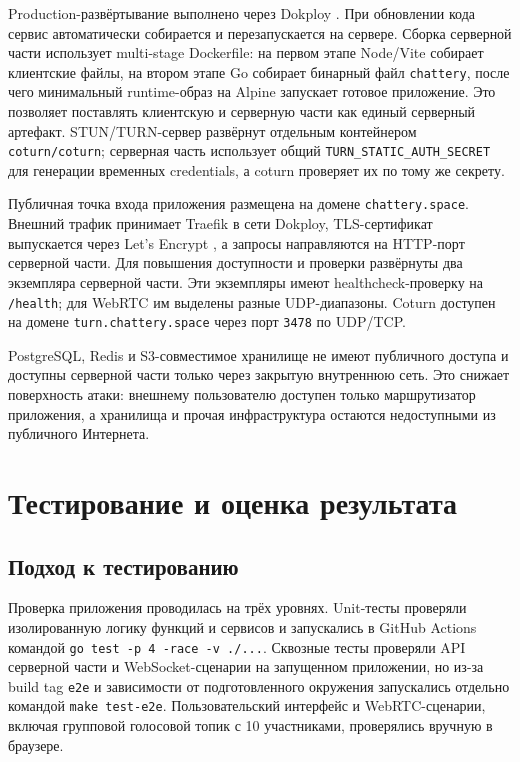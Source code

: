 \documentclass[a4paper,12pt]{extarticle}
\begin{document}
Production-развёртывание выполнено через Dokploy \cite{dokploy}. При обновлении кода сервис автоматически собирается и перезапускается на сервере. Сборка серверной части использует multi-stage Dockerfile: на первом этапе Node/Vite собирает клиентские файлы, на втором этапе Go собирает бинарный файл \texttt{chattery}, после чего минимальный runtime-образ на Alpine запускает готовое приложение. Это позволяет поставлять клиентскую и серверную части как единый серверный артефакт. STUN/TURN-сервер развёрнут отдельным контейнером \texttt{coturn/coturn}; серверная часть использует общий \texttt{TURN\_STATIC\_AUTH\_SECRET} для генерации временных credentials, а coturn проверяет их по тому же секрету.

Публичная точка входа приложения размещена на домене \texttt{chattery.space}. Внешний трафик принимает Traefik в сети Dokploy, TLS-сертификат выпускается через Let's Encrypt \cite{lets_encrypt}, а запросы направляются на HTTP-порт серверной части. Для повышения доступности и проверки развёрнуты два экземпляра серверной части. Эти экземпляры имеют healthcheck-проверку на \texttt{/health}; для WebRTC им выделены разные UDP-диапазоны. Coturn доступен на домене \texttt{turn.chattery.space} через порт \texttt{3478} по UDP/TCP.

PostgreSQL, Redis и S3-совместимое хранилище не имеют публичного доступа и доступны серверной части только через закрытую внутреннюю сеть. Это снижает поверхность атаки: внешнему пользователю доступен только маршрутизатор приложения, а хранилища и прочая инфраструктура остаются недоступными из публичного Интернета.

\section{Тестирование и оценка результата}

\subsection{Подход к тестированию}

Проверка приложения проводилась на трёх уровнях. Unit-тесты проверяли изолированную логику функций и сервисов и запускались в GitHub Actions командой \texttt{go test -p 4 -race -v ./...}. Сквозные тесты проверяли API серверной части и WebSocket-сценарии на запущенном приложении, но из-за build tag \texttt{e2e} и зависимости от подготовленного окружения запускались отдельно командой \texttt{make test-e2e}. Пользовательский интерфейс и WebRTC-сценарии, включая групповой голосовой топик с 10 участниками, проверялись вручную в браузере.
\end{document}
